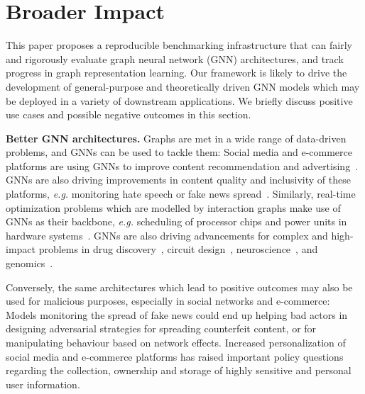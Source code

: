 \documentclass{article}
\begin{document}
\section*{Broader Impact}











This paper proposes a reproducible benchmarking infrastructure that can fairly and rigorously evaluate graph neural network (GNN) architectures, and track progress in graph representation learning.
Our framework is likely to drive the development of general-purpose and theoretically driven GNN models which may be deployed in a variety of downstream applications. We briefly discuss positive use cases and possible negative outcomes in this section.










\textbf{Better GNN architectures. }
Graphs are met in a wide range of data-driven problems, and GNNs can be used to tackle them:
Social media and e-commerce platforms are using GNNs to improve content recommendation and advertising~\cite{ying2018graph,zhu2019aligraph}. 
GNNs are also driving improvements in content quality and inclusivity of these platforms, \textit{e.g.} monitoring hate speech or fake news spread~\cite{monti2019fake}. 
Similarly, real-time optimization problems which are modelled by interaction graphs make use of GNNs as their backbone, \textit{e.g.} scheduling of processor chips and power units in hardware systems~\cite{mao2019learning,dean20201}.
GNNs are also driving advancements for complex and high-impact problems in drug discovery~\cite{raghu2020survey}, circuit design~\cite{mirhoseini2020chip}, neuroscience~\cite{griffa2017transient}, and genomics~\cite{gainza2020deciphering}.







Conversely, the same architectures which lead to positive outcomes may also be used for malicious purposes, especially in social networks and e-commerce:
Models monitoring the spread of fake news could end up helping bad actors in designing adversarial strategies for spreading counterfeit content, or for manipulating behaviour based on network effects.
Increased personalization of social media and e-commerce platforms has raised important policy questions regarding the collection, ownership and storage of highly sensitive and personal user information.
\end{document}
